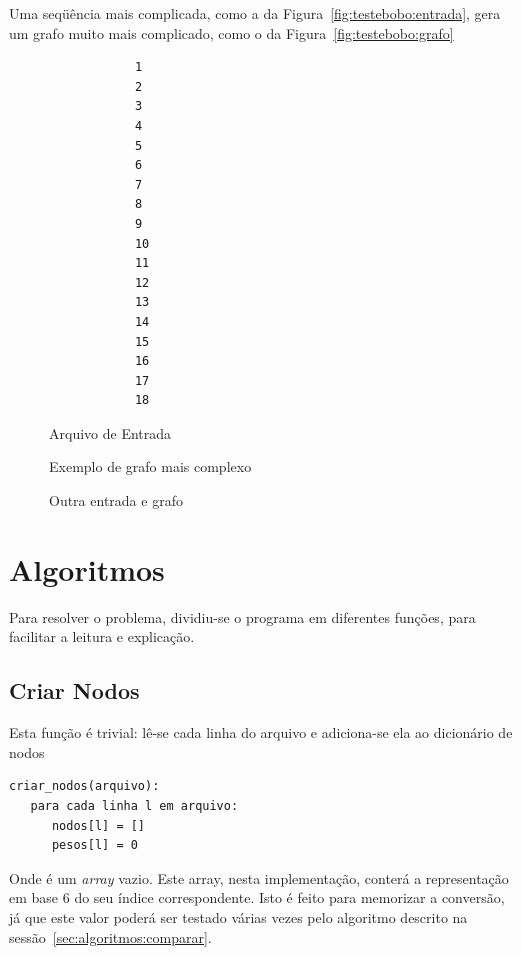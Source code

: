 \documentclass[12pt]{article}
\begin{document}
Uma seqüência mais complicada, como a da Figura~\ref{fig:testebobo:entrada}, gera um grafo muito mais complicado, como o da Figura~\ref{fig:testebobo:grafo}
\begin{figure}[H]
  \begin{minipage}[t]{0.3\columnwidth}
        \begin{lstlisting}
            1
            2
            3
            4
            5
            6
            7
            8
            9
            10
            11
            12
            13
            14
            15
            16
            17
            18
        \end{lstlisting}
      \caption{Arquivo de Entrada}
      \label{fig:testebobo:entrada}
  \end{minipage}%
  \begin{minipage}[t][1\totalheight][b]{0.65\textwidth}%
    \begin{dot2tex}[neato,options=-tmath]
        
    \end{dot2tex}
    \caption{Exemplo de grafo mais complexo}
    \label{fig:testebobo:grafo}
  \end{minipage}
  \caption{Outra entrada e grafo}
  \label{fig:testebobo}
\end{figure}


\section{Algoritmos}\label{sec:algoritmos}
Para resolver o problema, dividiu-se o programa em diferentes fun\c{c}ões, para facilitar a leitura e explica\c{c}ão.

\subsection{Criar Nodos}\label{sec:algoritmos:criar-nodos}
Esta fun\c{c}ão é trivial: lê-se cada linha do arquivo e adiciona-se ela ao dicionário de nodos
\begin{lstlisting}
criar_nodos(arquivo):
   para cada linha l em arquivo:
      nodos[l] = []
      pesos[l] = 0
\end{lstlisting}

Onde {\sf []} é um \textit{array} vazio. Este array, nesta implementa\c{c}ão, conterá a representa\c{c}ão em base 6 do seu índice correspondente. Isto é feito para memorizar a conversão, já que este valor poderá ser testado várias vezes pelo algoritmo descrito na sessão~\ref{sec:algoritmos:comparar}.
\end{document}
